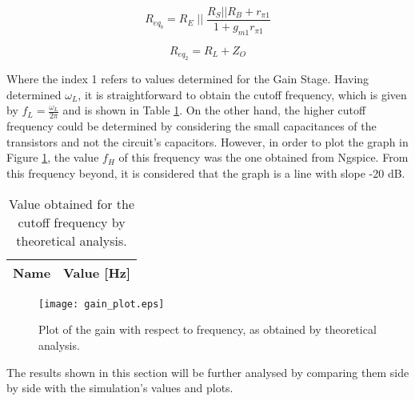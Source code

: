 \begin{equation} \label{eq:equivalent_resistance_b}
  R_{eq_b}=R_E\;||\;\frac{R_S||R_B+r_{\pi1}}{1+g_{m1}r_{\pi1}}
\end{equation}

\begin{equation} \label{eq:equivalent_resistance_2}
  R_{eq_2}=R_L+Z_O
\end{equation}


Where the index 1 refers to values determined for the Gain Stage. Having determined $\omega_L$, it is straightforward to obtain the cutoff frequency, which is given by $f_L=\frac{\omega_L}{2\pi}$ and is shown in Table \ref{tab:theoretical_cutoff}. On the other hand, the higher cutoff frequency could be determined by considering the small capacitances of the transistors and not the circuit's capacitors. However, in order to plot the graph in Figure \ref{fig:gain_plot}, the value $f_H$ of this frequency was the one obtained from Ngspice. From this frequency beyond, it is considered that the graph is a line with slope -20 dB.

\begin{table}[H]
  \centering
  \begin{tabular}{|c|c|}
    \hline    
    {\bf Name} & {\bf Value [Hz]} \\ \hline
    
  \end{tabular}
  \caption{Value obtained for the cutoff frequency by theoretical analysis.}
  \label{tab:theoretical_cutoff}
\end{table}


\begin{figure}[H] \centering
  \texttt{[image: gain\_plot.eps]}
  \caption{Plot of the gain with respect to frequency, as obtained by theoretical analysis.}
  \label{fig:gain_plot}
\end{figure}

The results shown in this section will be further analysed by comparing them side by side with the simulation's values and plots.
